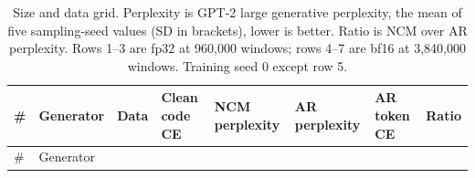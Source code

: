 \documentclass[
  british,
]{article}
\begin{document}
\begin{longtable}[]{@{}
  >{\raggedleft\arraybackslash}p{}
  >{\raggedright\arraybackslash}p{}
  >{\raggedright\arraybackslash}p{}
  >{\raggedleft\arraybackslash}p{}
  >{\raggedleft\arraybackslash}p{}
  >{\raggedleft\arraybackslash}p{}
  >{\raggedleft\arraybackslash}p{}
  >{\raggedleft\arraybackslash}p{}@{}}
\caption{Size and data grid. Perplexity is GPT-2 large generative
perplexity, the mean of five sampling-seed values (SD in brackets),
lower is better. Ratio is NCM over AR perplexity. Rows 1--3 are fp32 at
960,000 windows; rows 4--7 are bf16 at 3,840,000 windows. Training seed
0 except row 5.}\tabularnewline
\toprule\noalign{}
\begin{minipage}[b]{\linewidth}\raggedleft
\#
\end{minipage} & \begin{minipage}[b]{\linewidth}\raggedright
Generator
\end{minipage} & \begin{minipage}[b]{\linewidth}\raggedright
Data
\end{minipage} & \begin{minipage}[b]{\linewidth}\raggedleft
Clean code CE
\end{minipage} & \begin{minipage}[b]{\linewidth}\raggedleft
NCM perplexity
\end{minipage} & \begin{minipage}[b]{\linewidth}\raggedleft
AR perplexity
\end{minipage} & \begin{minipage}[b]{\linewidth}\raggedleft
AR token CE
\end{minipage} & \begin{minipage}[b]{\linewidth}\raggedleft
Ratio
\end{minipage} \\
\midrule\noalign{}
\endfirsthead
\toprule\noalign{}
\begin{minipage}[b]{\linewidth}\raggedleft
\#
\end{minipage} & \begin{minipage}[b]{\linewidth}\raggedright
Generator
\end{minipage} & \begin{minipage}[b]{\linewidth}\raggedright

\end{minipage}
\end{longtable}
\end{document}

